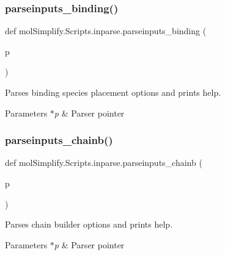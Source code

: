 \subsubsection{\texorpdfstring{parseinputs\+\_\+binding()}{parseinputs\_binding()}}
{\footnotesize\ttfamily def mol\+Simplify.\+Scripts.\+inparse.\+parseinputs\+\_\+binding (\begin{DoxyParamCaption}\item[{}]{p }\end{DoxyParamCaption})}



Parses binding species placement options and prints help. 


\begin{DoxyParams}{Parameters}
{\em $\ast$p} & Parser pointer \\
\hline
\end{DoxyParams}
\mbox{\label{namespacemolSimplify_1_1Scripts_1_1inparse_ac4c14316e76f7367738882af7c9becfb}} 
\subsubsection{\texorpdfstring{parseinputs\+\_\+chainb()}{parseinputs\_chainb()}}
{\footnotesize\ttfamily def mol\+Simplify.\+Scripts.\+inparse.\+parseinputs\+\_\+chainb (\begin{DoxyParamCaption}\item[{}]{p }\end{DoxyParamCaption})}



Parses chain builder options and prints help. 


\begin{DoxyParams}{Parameters}
{\em $\ast$p} & Parser pointer \\
\hline
\end{DoxyParams}
\mbox{\label{namespacemolSimplify_1_1Scripts_1_1inparse_a4074ca87aa16125d8d83ddb435dffdca}} 
